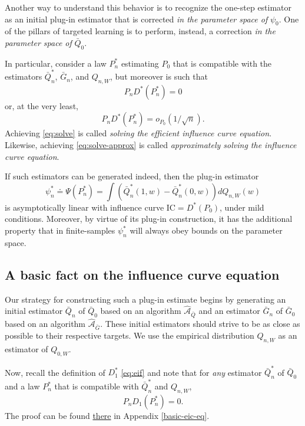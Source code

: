 \documentclass[
  11pt,
  openright,twoside]{book}
\newcommand{\Algo}{\widehat{\mathcal{A}}}
\newcommand{\defq}{\doteq}
\newcommand{\IC}{\textrm{IC}}
\newcommand{\Gbar}{\bar{G}}
\newcommand{\Qbar}{\bar{Q}}
\theoremstyle{definition}
\theoremstyle{definition}
\theoremstyle{definition}
\theoremstyle{definition}
\theoremstyle{remark}
\begin{document}
Another way to understand this behavior is to recognize the one-step estimator
as an initial plug-in estimator that is corrected \emph{in the parameter space of}
\(\psi_0\). One of the pillars of targeted learning is to perform, instead, a
correction \emph{in the parameter space of} \(\Qbar_0\).

In particular, consider a law \(P_{n}^{*}\) estimating \(P_{0}\) that is
compatible with the estimators \(\Qbar_n^*\), \(\Gbar_n\), and \(Q_{n,W}\), but
moreover is such that
\begin{equation} 
P_n  D^*(P_{n}^*)  = 0 \label{eq:solve}
\end{equation}
or, at the very least,
\begin{equation} 
P_n D^*(P_{n}^*) = o_{P_0}(1/\sqrt{n}). \label{eq:solve-approx} 
\end{equation}
Achieving \eqref{eq:solve} is called \emph{solving the efficient influence curve
equation}. Likewise, achieving \eqref{eq:solve-approx} is called
\emph{approximately solving the influence curve equation}.

If such estimators can be generated indeed, then the plug-in estimator
\begin{equation*}     \psi_n^*    \defq     \Psi(P_{n}^{*})    =     \int
\left(\Qbar_n^*(1,w)  - \Qbar_n^*(0,w)\right)  dQ_{n,W}(w) \end{equation*} is
asymptotically linear with influence curve \(\IC = D^{*}(P_{0})\), under mild
conditions. Moreover, by virtue of its plug-in construction, it has the
additional property that in finite-samples \(\psi_n^*\) will always obey bounds
on the parameter space.

\hypertarget{basic-fact}{%
\subsection{A basic fact on the influence curve equation}\label{basic-fact}}

Our strategy for constructing such a plug-in estimate begins by generating an
initial estimator \(\Qbar_n\) of \(\Qbar_0\) based on an algorithm \(\Algo_{\Qbar}\)
and an estimator \(\Gbar_n\) of \(\Gbar_0\) based on an algorithm \(\Algo_{\Gbar}\).
These initial estimators should strive to be as close as possible to their
respective targets. We use the empirical distribution \(Q_{n,W}\) as an
estimator of \(Q_{0,W}\).

Now, recall the definition of \(D_{1}^{*}\) \eqref{eq:eif} and note that for
\emph{any} estimator \(\Qbar_n^*\) of \(\Qbar_0\) and a law \(P_n^{*}\) that is
compatible with \(\Qbar_n^*\) and \(Q_{n,W}\), \begin{equation*}  P_{n}  D_{1}
(P_{n}^{*}) = 0.
\end{equation*}
The proof can be found \protect\hyperlink{basic-eic-eq}{there} in Appendix \ref{basic-eic-eq}.
\end{document}
